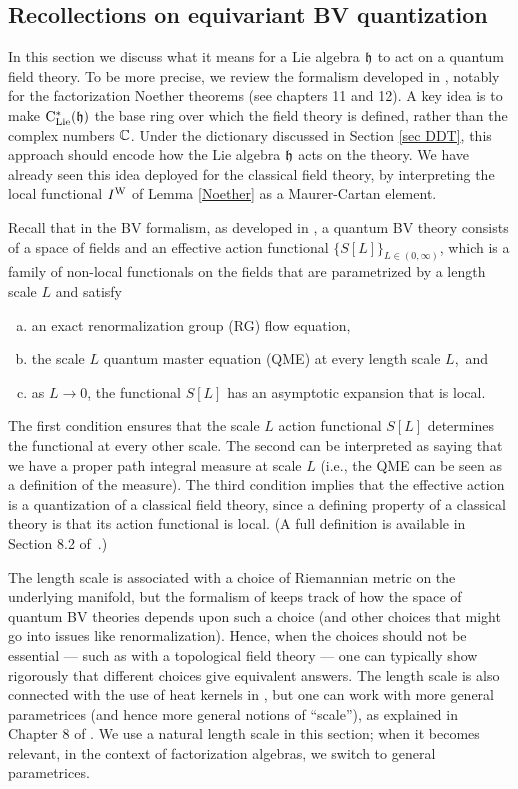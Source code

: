 \subsection{Recollections on equivariant BV quantization} \label{sec equiv bv 1}

In this section we discuss what it means for a Lie algebra $\mathfrak h$ to act on a quantum field theory.
To be more precise, we review the formalism developed in \cite{CG2}, notably for the factorization Noether theorems  (see chapters 11 and 12).
A key idea is to make ${\rm C}_{\rm Lie}^*(\mathfrak h)$ the base ring over which the field theory is defined, rather than the complex numbers $\mathbb C$.
Under the dictionary discussed in Section \ref{sec DDT}, this approach should encode how the Lie algebra $\mathfrak h$ acts on the theory.
We have already seen this idea deployed for the classical field theory, 
by interpreting the local functional $I^{\rm W}$ of Lemma \ref{Noether} as a Maurer-Cartan element.

Recall that in the BV formalism, as developed in \cite{CosBook,CG2}, 
a quantum BV theory consists of a space of fields and an effective action functional $\{S[L]\}_{L \in (0,\infty)}$,
which is a family of non-local functionals on the fields that are parametrized by a length scale $L$ 
and satisfy
\begin{enumerate}[(a)]
\item an exact renormalization group (RG) flow equation,
\item the scale $L$ quantum master equation (QME) at every length scale $L$,~and
\item as $L \to 0$, the functional $S[L]$ has an asymptotic expansion that is local.
\end{enumerate}
The first condition ensures that the scale $L$ action functional $S[L]$ determines the functional at every other scale.
The second can be interpreted as saying that we have a proper path integral measure at scale $L$ 
(i.e., the QME can be seen as a definition of the measure).
The third condition implies that the effective action is a quantization of a classical field theory,
since a defining property of a classical theory is that its action functional is local.
(A full definition is available in Section 8.2 of~\cite{CG2}.)

\begin{rmk}
The length scale is associated with a choice of Riemannian metric on the underlying manifold,
but the formalism of \cite{CosBook} keeps track of how the space of quantum BV theories depends upon such a choice 
(and other choices that might go into issues like renormalization).
Hence, when the choices should not be essential --- such as with a topological field theory --- one can typically show rigorously that different choices give equivalent answers.
The length scale is also connected with the use of heat kernels in \cite{CosBook},
but one can work with more general parametrices (and hence more general notions of ``scale''),
as explained in Chapter 8 of \cite{CG2}.
We use a natural length scale in this section; 
when it becomes relevant, in the context of factorization algebras, we switch to general parametrices.
\end{rmk}

